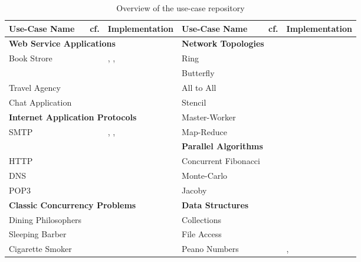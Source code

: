 \begin{table}[!h]
\begin{center}
\begin{tabular}{|l|l|l|l|l|l|}
	\hline
	Use-Case Name & cf. & Implementation
	&
	Use-Case Name & cf. & Implementation
	\\

	\hline
	\hline
	\multicolumn{3}{|l|}{ \textbf{Web Service Applications}}
	&
	\multicolumn{3}{|l|}{ \textbf{Network Topologies}}
	\\
	\hline
	Book Strore & \cite{W3C} & \SJ, \Mungo,
	&
	Ring & \cite{BerkleyPar} & \MPI	
	\\
	& & \JavaAPI
	&
	Butterfly & \cite{BerkleyPar} & \MPI
	\\
	Travel Agency & \cite{W3C} & \SJ
	&
	All to All & \cite{BerkleyPar} & \MPI	
	\\
	Chat Application & \cite{SF15} & \Erlang
	&
	Stencil & \cite{BerkleyPar} & \MPI
	\\

	\cline{1-3}
	\cline{1-3}
	\multicolumn{3}{|l|}{ \textbf{Internet Application Protocols}}
	&
	Master-Worker & \cite{BerkleyPar} & \MPI
	\\
	\cline{1-3}
	SMTP & \cite{RFC} & \Mungo, \Links,
	&
	Map-Reduce & \cite{BerkleyPar} & \MPI
	\\
	\cline{4-6}
	\cline{4-6}
	&&\JavaAPI
	&
	\multicolumn{3}{|l|}{ \textbf{Parallel Algorithms}}
	\\
	\cline{4-6}
	HTTP & \cite{RFC} & \JavaAPI
	&
	Concurrent Fibonacci &  & \Mungo
	\\
	DNS & \cite{RFC} & \Erlang
	&
	Monte-Carlo & \cite{citation_needed} & \MPI
	\\
	POP3 & \cite{RFC} & \Mungo
	&
	Jacoby & \cite{citation_needed} & \MPI
	\\

	\hline
	\multicolumn{3}{|l|}{ \textbf{Classic Concurrency Problems}}
	&
	\multicolumn{3}{|l|}{ \textbf{Data Structures}}
	\\
	\hline
	Dining Philosophers & \cite{Savina} & \SPython
	&
	Collections & \cite{mungo} & \Mungo
	\\
	Sleeping Barber & \cite{Savina} & \SPython
	&
	File Access & \cite{mungo} & \Mungo
	\\
	Cigarette Smoker & \cite{Savina} & \SPython
	&
	Peano Numbers & \cite{citation_needed} & \GV, \Links
	\\
	\hline
\end{tabular}
\end{center}
\caption{Overview of the use-case repository}
\label{table:use_cases_all}
\end{table}

